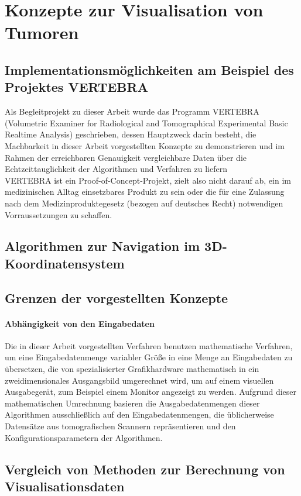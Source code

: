 \documentclass[a4paper,titlepage,12pt]{scrartcl}
\begin{document}
\section{Konzepte zur Visualisation von Tumoren}\label{ssec:concepts}
\subsection{Implementationsmöglichkeiten am Beispiel des Projektes VERTEBRA}\label{ssec:implementations}
Als Begleitprojekt zu dieser Arbeit wurde das Programm VERTEBRA
(Volumetric Examiner for Radiological and Tomographical Experimental Basic Realtime Analysis) geschrieben, dessen Hauptzweck darin besteht, die Machbarkeit in dieser Arbeit vorgestellten Konzepte zu demonstrieren und im Rahmen der erreichbaren Genauigkeit vergleichbare Daten über die Echtzeittauglichkeit der Algorithmen und Verfahren zu liefern \\
VERTEBRA ist ein Proof-of-Concept-Projekt, zielt also nicht darauf ab, ein im medizinischen Alltag einsetzbares Produkt zu sein oder die für eine Zulassung nach dem Medizinproduktegesetz (bezogen auf deutsches Recht) notwendigen Vorraussetzungen zu schaffen.
\subsection{Algorithmen zur Navigation im 3D-Koordinatensystem}\label{ssec:3dnav}
\subsection{Grenzen der vorgestellten Konzepte}\label{ssec:limits}
\paragraph{Abhängigkeit von den Eingabedaten}
Die in dieser Arbeit vorgestellten Verfahren benutzen mathematische Verfahren, um eine Eingabedatenmenge variabler Größe in eine Menge an Eingabedaten zu übersetzen, die von spezialisierter Grafikhardware mathematisch in ein zweidimensionales Ausgangsbild umgerechnet wird, um auf einem visuellen Ausgabegerät, zum Beispiel einem Monitor angezeigt zu werden. Aufgrund dieser mathematischen Umrechnung basieren die Ausgabedatenmengen dieser Algorithmen ausschließlich auf den Eingabedatenmengen, die üblicherweise Datensätze aus tomografischen Scannern repräsentieren und den Konfigurationsparametern der Algorithmen.
\subsection{Vergleich von Methoden zur Berechnung von Visualisationsdaten}
\end{document}
